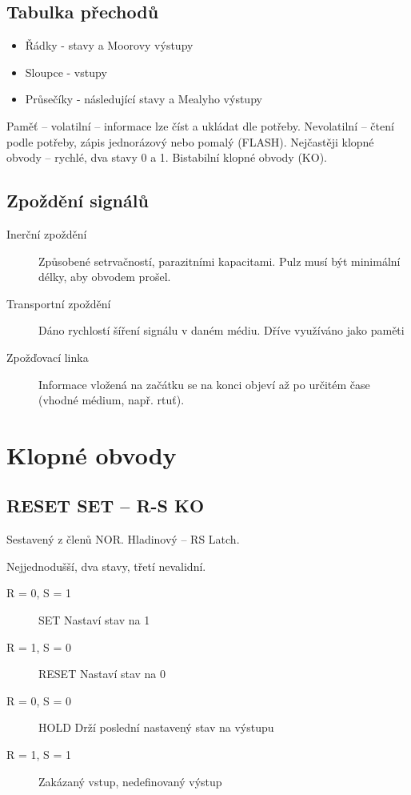\documentclass[a4wide]{report}
\begin{document}
\subsection{Tabulka přechodů}

\begin{itemize}
	\item Řádky - stavy a Moorovy výstupy
	\item Sloupce - vstupy
	\item Průsečíky - následující stavy a Mealyho výstupy
\end{itemize}

Paměť -- volatilní -- informace lze číst a ukládat dle potřeby. Nevolatilní -- čtení podle potřeby, zápis jednorázový nebo pomalý (FLASH). Nejčastěji klopné obvody -- rychlé, dva stavy 0 a 1. Bistabilní klopné obvody (KO).

\subsection{Zpoždění signálů}

\begin{description}
	\item[Inerční zpoždění] Způsobené setrvačností, parazitními kapacitami. Pulz musí být minimální délky, aby obvodem prošel.
	\item[Transportní zpoždění] Dáno rychlostí šíření signálu v daném médiu. Dříve využíváno jako paměti
	\item[Zpožďovací linka] Informace vložená na začátku se na konci objeví až po určitém čase  (vhodné médium, např. rtuť).
\end{description}

\section{Klopné obvody}

\subsection{RESET SET -- R-S KO}

Sestavený z členů NOR. Hladinový -- RS Latch.

Nejjednodušší, dva stavy, třetí nevalidní.

\begin{description}
	\item[R = 0, S = 1] SET Nastaví stav na 1
	\item[R = 1, S = 0] RESET Nastaví stav na 0
	\item[R = 0, S = 0] HOLD Drží poslední nastavený stav na výstupu
	\item[R = 1, S = 1] Zakázaný vstup, nedefinovaný výstup
\end{description}
\end{document}
